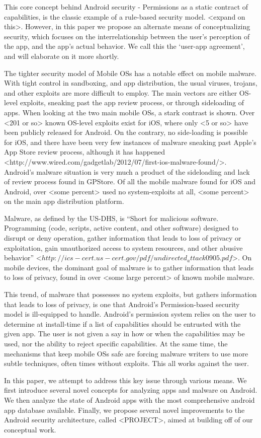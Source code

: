 This core concept behind Android security - Permissions as a static contract of capabilities, is the classic example of a rule-based security model. <expand on this>. However, in this paper we propose an alternate means of conceptualizing security, which focuses on the interrelationship between the user’s perception of the app, and the app’s actual behavior. We call this the ‘user-app agreement’, and will elaborate on it more shortly. 

The tighter security model of Mobile OSs has a notable effect on mobile malware. With tight control in sandboxing, and app distribution, the usual viruses, trojans, and other exploits are more difficult to employ. The main vectors are either OS-level exploits, sneaking past the app review process, or through sideloading of apps. When looking at the two main mobile OSs, a stark contrast is shown. Over <201 or so> known OS-level exploits exist for iOS, where only <5 or so> have been publicly released for Android. On the contrary, no side-loading is possible for iOS, and there have been very few instances of malware sneaking past Apple’s App Store review process, although it has happened <http://www.wired.com/gadgetlab/2012/07/first-ios-malware-found/>. Android’s malware situation is very much a product of the sideloading and lack of review process found in GPStore. Of all the mobile malware found for iOS and Android, over <some percent> used no system-exploits at all, <some percent> on the main app distribution platform.

Malware, as defined by the US-DHS, is “Short for malicious software. Programming (code, scripts, active content, and other software) designed to disrupt or deny operation, gather information that leads to loss of privacy or exploitation, gain unauthorized access to system resources, and other abusive behavior” <$http://ics-cert.us-cert.gov/pdf/undirected_attack0905.pdf$>. On mobile devices, the dominant goal of malware is to gather information that leads to loss of privacy, found in over <some large percent> of known mobile malware. 

This trend, of malware that possesses no system exploits, but gathers information that leads to loss of privacy, is one that Android’s Permission-based security model is ill-equipped to handle. Android’s permission system relies on the user to determine at install-time if a list of capabilities should be entrusted with the given app. The user is not given a say in how or when the capabilities may be used, nor the ability to reject specific capabilities. At the same time, the mechanisms that keep mobile OSs safe are forcing malware writers to use more subtle techniques, often times without exploits. This all works against the user.

In this paper, we attempt to address this key issue through various means. We first introduce several novel concepts for analyzing apps and malware on Android. We then analyze the state of Android apps with the most comprehensive android app database available. Finally, we propose several novel improvements to the Android security architecture, called <PROJECT>, aimed at building off of our conceptual work.

